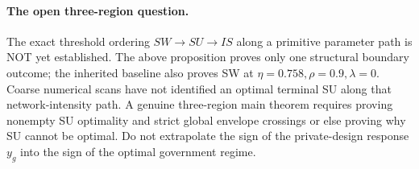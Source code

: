\paragraph{The open three-region question.}
The exact threshold ordering $SW\to SU\to IS$ along a primitive
parameter path is NOT yet established. The above proposition proves only
one structural boundary outcome; the inherited baseline also proves SW
at $\eta=0.758,\rho=0.9,\lambda=0$. Coarse numerical scans have not
identified an optimal terminal SU along that network-intensity path.
A genuine three-region main theorem requires proving nonempty SU
optimality and strict global envelope crossings or else proving why
SU cannot be optimal. Do not extrapolate the sign of the private-design
response $y_g$ into the sign of the optimal government regime.
